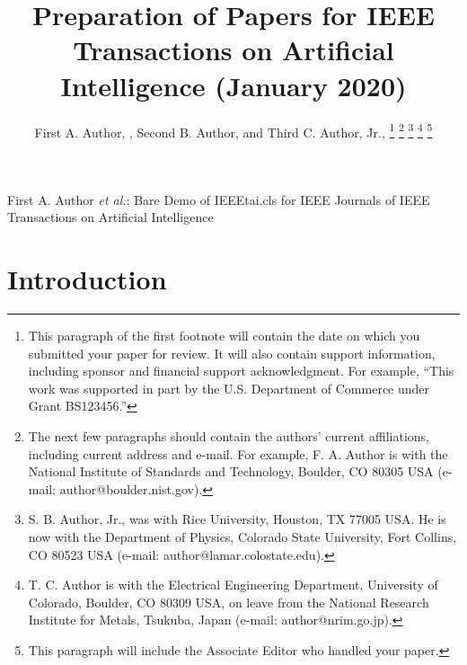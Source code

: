 \documentclass[journal]{IEEEtai}
\begin{document}
\title{Preparation of Papers for IEEE {\sc Transactions on Artificial Intelligence} (January 2020)} 


\author{First A. Author, , Second B. Author, and Third C. Author, Jr., 
\thanks{This paragraph of the first footnote will contain the date on which you submitted your paper for review. It will also contain support information, including sponsor and financial support acknowledgment. For example, ``This work was supported in part by the U.S. Department of Commerce under Grant BS123456.'' }
\thanks{The next few paragraphs should contain the authors' current affiliations, including current address and e-mail. For example, F. A. Author is with the National Institute of Standards and Technology, Boulder, CO 80305 USA (e-mail: author@boulder.nist.gov).}
\thanks{S. B. Author, Jr., was with Rice University, Houston, TX 77005 USA. He is now with the Department of Physics, Colorado State University, Fort Collins, CO 80523 USA (e-mail: author@lamar.colostate.edu).}
\thanks{T. C. Author is with the Electrical Engineering Department, University of Colorado, Boulder, CO 80309 USA, on leave from the National Research Institute for Metals, Tsukuba, Japan (e-mail: author@nrim.go.jp).}
\thanks{This paragraph will include the Associate Editor who handled your paper.}}

{First A. Author \MakeLowercase{\textit{et al.}}: Bare Demo of IEEEtai.cls for IEEE Journals of IEEE Transactions on Artificial Intelligence}

\maketitle

\begin{abstract}

\end{abstract}

\begin{IEEEImpStatement}

\end{IEEEImpStatement}

\begin{IEEEkeywords}

\end{IEEEkeywords}



\section{Introduction}
\end{document}
